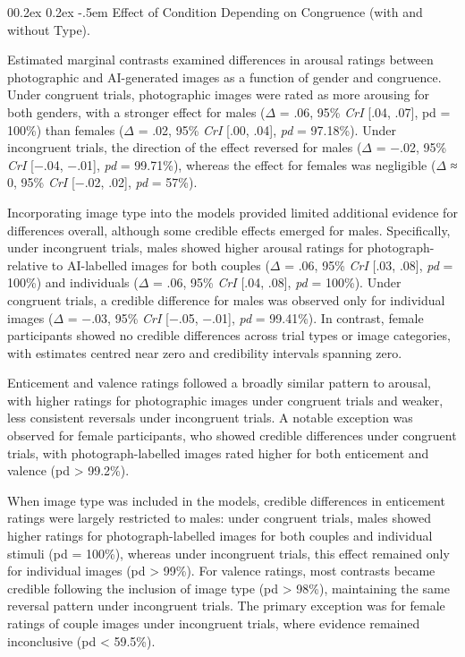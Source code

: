 \documentclass[
  jou,
  floatsintext,
  longtable,
  nolmodern,
  notxfonts,
  notimes,
  colorlinks=true,linkcolor=blue,citecolor=blue,urlcolor=blue]{apa7}
\makeatletter
\renewcommand{\paragraph}{\@startsection{paragraph}{4}{\parindent}%
	{0\baselineskip \@plus 0.2ex \@minus 0.2ex}%
	{-.5em}%
	{\normalfont\normalsize\bfseries\typesectitle}}
\makeatother
\begin{document}
\paragraph{Effect of Condition Depending on Congruence (with and without
Type).}\label{effect-of-condition-depending-on-congruence-with-and-without-type.}

Estimated marginal contrasts examined differences in arousal ratings
between photographic and AI-generated images as a function of gender and
congruence. Under congruent trials, photographic images were rated as
more arousing for both genders, with a stronger effect for males
(\(\Delta\) = .06, 95\% \emph{CrI} {[}.04, .07{]}, pd = 100\%) than
females (\(\Delta\) = .02, 95\% \emph{CrI} {[}.00, .04{]}, \emph{pd} =
97.18\%). Under incongruent trials, the direction of the effect reversed
for males (\(\Delta\) = −.02, 95\% \emph{CrI} {[}−.04, −.01{]},
\emph{pd} = 99.71\%), whereas the effect for females was negligible
(\(\Delta\) ≈ 0, 95\% \emph{CrI} {[}−.02, .02{]}, \emph{pd} = 57\%).

Incorporating image type into the models provided limited additional
evidence for differences overall, although some credible effects emerged
for males. Specifically, under incongruent trials, males showed higher
arousal ratings for photograph- relative to AI-labelled images for both
couples (\(\Delta\) = .06, 95\% \emph{CrI} {[}.03, .08{]}, \emph{pd} =
100\%) and individuals (\(\Delta\) = .06, 95\% \emph{CrI} {[}.04,
.08{]}, \emph{pd} = 100\%). Under congruent trials, a credible
difference for males was observed only for individual images (\(\Delta\)
= −.03, 95\% \emph{CrI} {[}−.05, −.01{]}, \emph{pd} = 99.41\%). In
contrast, female participants showed no credible differences across
trial types or image categories, with estimates centred near zero and
credibility intervals spanning zero.

Enticement and valence ratings followed a broadly similar pattern to
arousal, with higher ratings for photographic images under congruent
trials and weaker, less consistent reversals under incongruent trials. A
notable exception was observed for female participants, who showed
credible differences under congruent trials, with photograph-labelled
images rated higher for both enticement and valence (pd \textgreater{}
99.2\%).

When image type was included in the models, credible differences in
enticement ratings were largely restricted to males: under congruent
trials, males showed higher ratings for photograph-labelled images for
both couples and individual stimuli (pd = 100\%), whereas under
incongruent trials, this effect remained only for individual images (pd
\textgreater{} 99\%). For valence ratings, most contrasts became
credible following the inclusion of image type (pd \textgreater{} 98\%),
maintaining the same reversal pattern under incongruent trials. The
primary exception was for female ratings of couple images under
incongruent trials, where evidence remained inconclusive (pd \textless{}
59.5\%).
\end{document}
